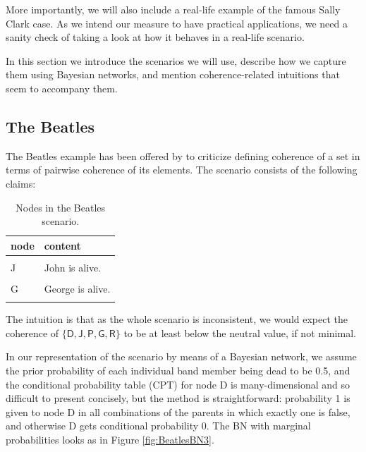 \documentclass[10pt,]{scrartcl}
\begin{document}
More importantly, we will also include a real-life example of the famous Sally Clark case. As we intend our measure to have practical applications, we need a sanity check of taking a look at how it behaves in a real-life scenario. 

 In this section we introduce the scenarios we will use, describe how we capture them using Bayesian networks, and mention coherence-related intuitions that seem to accompany them. 







\subsection{The Beatles}

 The Beatles example has been offered by \citet[339]{shogenji1999conducive} to criticize defining coherence of a set in terms of   pairwise coherence of its elements.   The scenario consists of the following claims:

\begin{table}[H]
\centering
\begin{tabular}{ll}
\toprule
node & content\\
\midrule
\cellcolor{gray!6}{D} & \cellcolor{gray!6}{Exactly one of the Beatles (John, Paul, George and Ringo) is dead.}\\
J & John is alive.\\
\cellcolor{gray!6}{P} & \cellcolor{gray!6}{Paul is alive.}\\
G & George is alive.\\
\cellcolor{gray!6}{R} & \cellcolor{gray!6}{Ringo is alive.}\\
\bottomrule
\end{tabular}
\caption{Nodes in the Beatles scenario.}
\label{tab:beatles}
\end{table}

The intuition is that as the whole scenario is inconsistent, we would expect the coherence of  $\{\mathsf{D,J,P,G,R}\}$ to be at least below the neutral value, if not minimal.


In our representation of the scenario by means of a Bayesian network,  we assume the prior probability of each individual band member being
dead to be 0.5, and the conditional probability table (CPT) for node \textsf{D} is
many-dimensional and so difficult to present concisely, but the method
is straightforward: probability 1 is given to node \textsf{D} in all
combinations of the parents in which exactly one is false, and otherwise
\textsf{D} gets conditional probability 0. The BN with marginal probabilities looks as in Figure \ref{fig:BeatlesBN3}.
\end{document}
